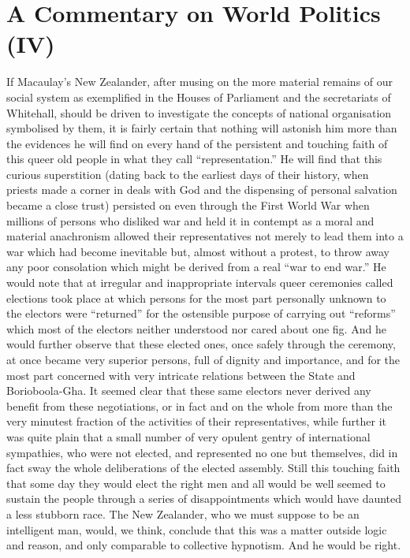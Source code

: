 \documentclass{book}
\begin{document}
\chapter{A Commentary on World Politics (IV)}
\label{chapter-12}
If Macaulay’s New Zealander, after musing on the more material remains of our social system as exemplified in the Houses of Parliament and the secretariats of Whitehall, should be driven to investigate the concepts of national organisation symbolised by them, it is fairly certain that nothing will astonish him more than the evidences he will find on every hand of the persistent and touching faith of this queer old people in what they call “representation.” He will find that this curious superstition (dating back to the earliest days of their history, when priests made a corner in deals with God and the dispensing of personal salvation became a close trust) persisted on even through the First World War when millions of persons who disliked war and held it in contempt as a moral and material anachronism allowed their representatives not merely to lead them into a war which had become inevitable but, almost without a protest, to throw away any poor consolation which might be derived from a real “war to end war.” He would note that at irregular and inappropriate intervals queer ceremonies called elections took place at which persons for the most part personally unknown to the electors were “returned” for the ostensible purpose of carrying out “reforms” which most of the electors neither understood nor cared about one fig. And he would further observe that these elected ones, once safely through the ceremony, at once became very superior persons, full of dignity and importance, and for the most part concerned with very intricate relations between the State and Borioboola-Gha. It seemed clear that these same electors never derived any benefit from these negotiations, or in fact and on the whole from more than the very minutest fraction of the activities of their representatives, while further it was quite plain that a small number of very opulent gentry of international sympathies, who were not elected, and represented no one but themselves, did in fact sway the whole deliberations of the elected assembly. Still this touching faith that some day they would elect the right men and all would be well seemed to sustain the people through a series of disappointments which would have daunted a less stubborn race. The New Zealander, who we must suppose to be an intelligent man, would, we think, conclude that this was a matter outside logic and reason, and only comparable to collective hypnotism. And he would be right.
\end{document}
